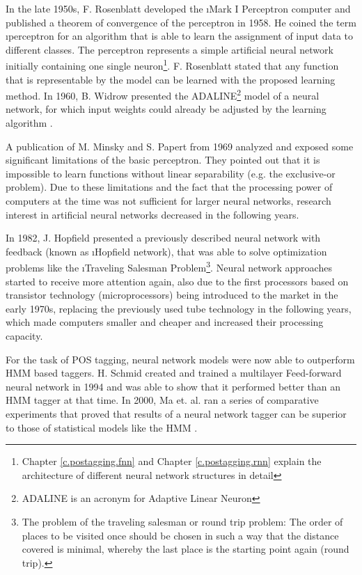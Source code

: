 In the late 1950s, F. Rosenblatt developed the \i{Mark I Perceptron} computer and published a theorem of convergence of the perceptron\cite{rosenblatt1958} in 1958. He coined the term \i{perceptron} for an algorithm that is able to learn the assignment of input data to different classes. The perceptron represents a simple artificial neural network initially containing one single neuron\footnote{Chapter \ref{c.postagging.fnn} and Chapter \ref{c.postagging.rnn} explain the architecture of different neural network structures in detail}. F. Rosenblatt stated that any function that is representable by the model can be learned with the proposed learning method. In 1960, B. Widrow presented the ADALINE\footnote{ADALINE is an acronym for Adaptive Linear Neuron} model of a neural network, for which input weights could already be adjusted by the learning algorithm \cite{widrow1960}.

A publication of M. Minsky and S. Papert \cite{minsky1969} from 1969 analyzed and exposed some significant limitations of the basic perceptron. They pointed out that it is impossible to learn functions without linear separability (e.g. the exclusive-or problem). Due to these limitations and the fact that the processing power of computers at the time was not sufficient for larger neural networks, research interest in artificial neural networks decreased in the following years.

In 1982, J. Hopfield presented a previously described neural network with feedback (known as \i{Hopfield network}), that was able to solve optimization problems like the \i{Traveling Salesman Problem}\footnote{The problem of the traveling salesman or round trip problem: The order of places to be visited once should be chosen in such a way that the distance covered is minimal, whereby the last place is the starting point again (round trip).}. Neural network approaches started to receive more attention again, also due to the first processors based on transistor technology (microprocessors) being introduced to the market in the early 1970s, replacing the previously used tube technology in the following years, which made computers smaller and cheaper and increased their processing capacity.

For the task of POS tagging, neural network models were now able to outperform HMM based taggers. H. Schmid created and trained a multilayer Feed-forward neural network in 1994 and was able to show that it performed better than an HMM tagger \cite{schmid1994} at that time. In 2000, Ma et. al. ran a series of comparative experiments that proved that results of a neural network tagger can be superior to those of statistical models like the HMM \cite{ma2000}.

